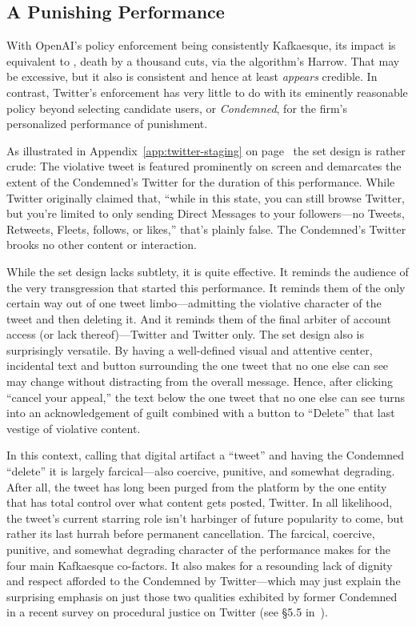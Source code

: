 \subsection{A Punishing Performance}

With OpenAI's policy enforcement being consistently Kafkaesque, its impact is
equivalent to \lingchi, death by a thousand cuts, via the algorithm's Harrow.
That may be excessive, but it also is consistent and hence at least
\emph{appears} credible. In contrast, Twitter's enforcement has very little to
do with its eminently reasonable policy beyond selecting candidate users, or
\emph{Condemned}, for the firm's personalized performance of punishment.

As illustrated in Appendix~\ref{app:twitter-staging} on
page~\pageref{app:twitter-staging} the set design is rather crude: The
violative tweet is featured prominently on screen and demarcates the extent of
the Condemned's Twitter for the duration of this performance. While Twitter
originally claimed that, ``while in this state, you can still browse Twitter,
but you're limited to only sending Direct Messages to your followers---no
Tweets, Retweets, Fleets, follows, or likes,'' that's plainly false. The
Condemned's Twitter brooks no other content or interaction.

While the set design lacks subtlety, it is quite effective. It reminds the
audience of the very transgression that started this performance. It reminds
them of the only certain way out of one tweet limbo---admitting the violative
character of the tweet and then deleting it. And it reminds them of the final
arbiter of account access (or lack thereof)---Twitter and Twitter only. The set
design also is surprisingly versatile. By having a well-defined visual and
attentive center, incidental text and button surrounding the one tweet that no
one else can see may change without distracting from the overall message. Hence,
after clicking ``cancel your appeal,'' the text below the one tweet that no one
else can see turns into an acknowledgement of guilt combined with a button to
``Delete'' that last vestige of violative content.

In this context, calling that digital artifact a ``tweet'' and having the
Condemned ``delete'' it is largely farcical---also coercive, punitive, and
somewhat degrading. After all, the tweet has long been purged from the platform
by the one entity that has total control over what content gets posted, Twitter.
In all likelihood, the tweet's current starring role isn't harbinger of future
popularity to come, but rather its last hurrah before permanent cancellation.
The farcical, coercive, punitive, and somewhat degrading character of the
performance makes for the four main Kafkaesque co-factors. It also makes for a
resounding lack of dignity and respect afforded to the Condemned by
Twitter---which may just explain the surprising emphasis on just those two
qualities exhibited by former Condemned in a recent survey on procedural justice
on Twitter (see \S5.5 in~\cite{KatsarosTylerea2022}).

